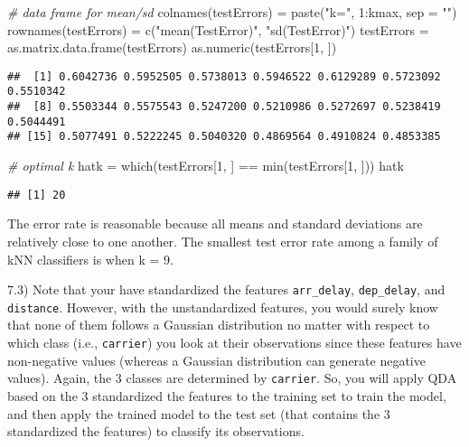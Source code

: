 \documentclass[
  11pt,
]{article}
\newenvironment{Shaded}{\begin{snugshade}}{\end{snugshade}}
\newcommand{\AttributeTok}[1]{\textcolor[rgb]{0.77,0.63,0.00}{#1}}
\newcommand{\CommentTok}[1]{\textcolor[rgb]{0.56,0.35,0.01}{\textit{#1}}}
\newcommand{\DecValTok}[1]{\textcolor[rgb]{0.00,0.00,0.81}{#1}}
\newcommand{\FunctionTok}[1]{\textcolor[rgb]{0.00,0.00,0.00}{#1}}
\newcommand{\NormalTok}[1]{#1}
\newcommand{\OtherTok}[1]{\textcolor[rgb]{0.56,0.35,0.01}{#1}}
\newcommand{\SpecialCharTok}[1]{\textcolor[rgb]{0.00,0.00,0.00}{#1}}
\newcommand{\StringTok}[1]{\textcolor[rgb]{0.31,0.60,0.02}{#1}}
\begin{document}
\begin{Shaded}
\begin{Highlighting}[]
\CommentTok{\# data frame for mean/sd}
\FunctionTok{colnames}\NormalTok{(testErrors) }\OtherTok{=} \FunctionTok{paste}\NormalTok{(}\StringTok{"k="}\NormalTok{, }\DecValTok{1}\SpecialCharTok{:}\NormalTok{kmax, }\AttributeTok{sep =} \StringTok{""}\NormalTok{)}
\FunctionTok{rownames}\NormalTok{(testErrors) }\OtherTok{=} \FunctionTok{c}\NormalTok{(}\StringTok{"mean(TestError)"}\NormalTok{, }\StringTok{"sd(TestError)"}\NormalTok{)}
\NormalTok{testErrors }\OtherTok{=} \FunctionTok{as.matrix.data.frame}\NormalTok{(testErrors)}
\FunctionTok{as.numeric}\NormalTok{(testErrors[}\DecValTok{1}\NormalTok{, ])}
\end{Highlighting}
\end{Shaded}

\begin{verbatim}
##  [1] 0.6042736 0.5952505 0.5738013 0.5946522 0.6129289 0.5723092 0.5510342
##  [8] 0.5503344 0.5575543 0.5247200 0.5210986 0.5272697 0.5238419 0.5044491
## [15] 0.5077491 0.5222245 0.5040320 0.4869564 0.4910824 0.4853385
\end{verbatim}

\begin{Shaded}
\begin{Highlighting}[]
\CommentTok{\# optimal k}
\NormalTok{hatk }\OtherTok{=} \FunctionTok{which}\NormalTok{(testErrors[}\DecValTok{1}\NormalTok{, ] }\SpecialCharTok{==} \FunctionTok{min}\NormalTok{(testErrors[}\DecValTok{1}\NormalTok{, ]))}
\NormalTok{hatk}
\end{Highlighting}
\end{Shaded}

\begin{verbatim}
## [1] 20
\end{verbatim}

The error rate is reasonable because all means and standard deviations
are relatively close to one another. The smallest test error rate among
a family of kNN classifiers is when k = 9.

7.3) Note that your have standardized the features \texttt{arr\_delay},
\texttt{dep\_delay}, and \texttt{distance}. However, with the
unstandardized features, you would surely know that none of them follows
a Gaussian distribution no matter with respect to which class (i.e.,
\texttt{carrier}) you look at their observations since these features
have non-negative values (whereas a Gaussian distribution can generate
negative values). Again, the 3 classes are determined by
\texttt{carrier}. So, you will apply QDA based on the 3 standardized the
features to the training set to train the model, and then apply the
trained model to the test set (that contains the 3 standardized the
features) to classify its observations.
\end{document}

